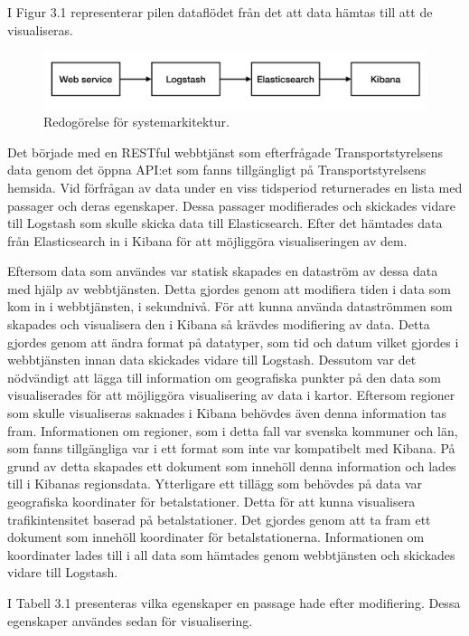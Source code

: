 \documentclass{kththesis}
\begin{document}
I Figur 3.1 representerar pilen dataflödet från det att data hämtas till att de visualiseras. 

\begin{figure}[h]
\centering
\includegraphics[width=1\textwidth]{Systemarkitektur}
\caption{Redogörelse för systemarkitektur.}
\end{figure}

Det började med en RESTful webbtjänst som efterfrågade Transportstyrelsens data genom det öppna API:et som fanns tillgängligt på Transportstyrelsens hemsida. Vid förfrågan av data under en viss tidsperiod returnerades en lista med passager och deras egenskaper. Dessa passager modifierades och skickades vidare till Logstash som skulle skicka data till Elasticsearch. Efter det hämtades data från Elasticsearch in i Kibana för att möjliggöra visualiseringen av dem.  

Eftersom data som användes var statisk skapades en dataström av dessa data med hjälp av webbtjänsten. Detta gjordes genom att modifiera tiden i data som kom in i webbtjänsten, i sekundnivå. För att kunna använda dataströmmen som skapades och visualisera den i Kibana så krävdes modifiering av data. Detta gjordes genom att ändra format på datatyper, som tid och datum vilket gjordes i webbtjänsten innan data skickades vidare till Logstash. Dessutom var det nödvändigt att lägga till information om geografiska punkter på den data som visualiserades för att möjliggöra visualisering av data i kartor. Eftersom regioner som skulle visualiseras saknades i Kibana behövdes även denna information tas fram. Informationen om regioner, som i detta fall var svenska kommuner och län, som fanns tillgängliga var i ett format som inte var kompatibelt med Kibana. På grund av detta skapades ett dokument som innehöll denna information och lades till i Kibanas regionsdata. Ytterligare ett tillägg som behövdes på data var geografiska koordinater för betalstationer. Detta för att kunna visualisera trafikintensitet baserad på betalstationer. Det gjordes genom att ta fram ett dokument som innehöll koordinater för betalstationerna. Informationen om koordinater lades till i all data som hämtades genom webbtjänsten och skickades vidare till Logstash. 

I Tabell 3.1 presenteras vilka egenskaper en passage hade efter modifiering. Dessa egenskaper användes sedan för visualisering. 
\end{document}
